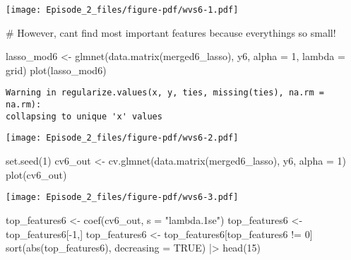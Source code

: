 \documentclass[
  letterpaper,
  DIV=11,
  numbers=noendperiod]{scrartcl}
\newenvironment{Shaded}{\begin{snugshade}}{\end{snugshade}}
\newcommand{\AttributeTok}[1]{\textcolor[rgb]{0.40,0.45,0.13}{#1}}
\newcommand{\CommentTok}[1]{\textcolor[rgb]{0.37,0.37,0.37}{#1}}
\newcommand{\ConstantTok}[1]{\textcolor[rgb]{0.56,0.35,0.01}{#1}}
\newcommand{\DecValTok}[1]{\textcolor[rgb]{0.68,0.00,0.00}{#1}}
\newcommand{\FunctionTok}[1]{\textcolor[rgb]{0.28,0.35,0.67}{#1}}
\newcommand{\NormalTok}[1]{\textcolor[rgb]{0.00,0.23,0.31}{#1}}
\newcommand{\OtherTok}[1]{\textcolor[rgb]{0.00,0.23,0.31}{#1}}
\newcommand{\SpecialCharTok}[1]{\textcolor[rgb]{0.37,0.37,0.37}{#1}}
\newcommand{\StringTok}[1]{\textcolor[rgb]{0.13,0.47,0.30}{#1}}
\begin{document}
\texttt{[image: Episode\_2\_files/figure-pdf/wvs6-1.pdf]}

\begin{Shaded}
\begin{Highlighting}[]
\CommentTok{\# However, can\textquotesingle{}t find most important features because everything\textquotesingle{}s so small!}

\NormalTok{lasso\_mod6 }\OtherTok{\textless{}{-}} \FunctionTok{glmnet}\NormalTok{(}\FunctionTok{data.matrix}\NormalTok{(merged6\_lasso), y6, }\AttributeTok{alpha =} \DecValTok{1}\NormalTok{, }\AttributeTok{lambda =}\NormalTok{ grid)}
\FunctionTok{plot}\NormalTok{(lasso\_mod6)}
\end{Highlighting}
\end{Shaded}

\begin{verbatim}
Warning in regularize.values(x, y, ties, missing(ties), na.rm = na.rm):
collapsing to unique 'x' values
\end{verbatim}

\texttt{[image: Episode\_2\_files/figure-pdf/wvs6-2.pdf]}

\begin{Shaded}
\begin{Highlighting}[]
\FunctionTok{set.seed}\NormalTok{(}\DecValTok{1}\NormalTok{)}
\NormalTok{cv6\_out }\OtherTok{\textless{}{-}} \FunctionTok{cv.glmnet}\NormalTok{(}\FunctionTok{data.matrix}\NormalTok{(merged6\_lasso), y6, }\AttributeTok{alpha =} \DecValTok{1}\NormalTok{)}
\FunctionTok{plot}\NormalTok{(cv6\_out)}
\end{Highlighting}
\end{Shaded}

\texttt{[image: Episode\_2\_files/figure-pdf/wvs6-3.pdf]}

\begin{Shaded}
\begin{Highlighting}[]
\NormalTok{top\_features6 }\OtherTok{\textless{}{-}} \FunctionTok{coef}\NormalTok{(cv6\_out, }\AttributeTok{s =} \StringTok{"lambda.1se"}\NormalTok{)}
\NormalTok{top\_features6 }\OtherTok{\textless{}{-}}\NormalTok{ top\_features6[}\SpecialCharTok{{-}}\DecValTok{1}\NormalTok{,]}
\NormalTok{top\_features6 }\OtherTok{\textless{}{-}}\NormalTok{ top\_features6[top\_features6 }\SpecialCharTok{!=} \DecValTok{0}\NormalTok{]}
\FunctionTok{sort}\NormalTok{(}\FunctionTok{abs}\NormalTok{(top\_features6), }\AttributeTok{decreasing =} \ConstantTok{TRUE}\NormalTok{) }\SpecialCharTok{|\textgreater{}} \FunctionTok{head}\NormalTok{(}\DecValTok{15}\NormalTok{)}
\end{Highlighting}
\end{Shaded}
\end{document}
